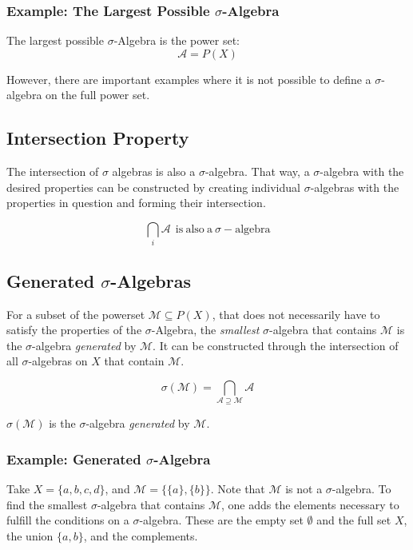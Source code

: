 \subsubsection{Example: The Largest Possible $\sigma$-Algebra} 
The largest possible $\sigma$-Algebra is the power set:
\begin{equation}
\mathscr{A} = P(X)
\end{equation}

However, there are important examples where it is not possible to define a $\sigma$-algebra on the full power set. 


\subsection{Intersection Property}
The intersection of $\sigma$ algebras is also a $\sigma$-algebra. That way, a $\sigma$-algebra with the desired properties can be constructed by creating individual $\sigma$-algebras with the properties in question and forming their intersection.

\begin{equation}
\bigcap_i \mathscr{A} \ \ \mathrm{is\ also\ a\ }\sigma-\mathrm{algebra}
\end{equation}


\subsection{Generated $\sigma$-Algebras}

For a subset of the powerset $\mathscr{M} \subseteq P(X)$, that does not necessarily have to satisfy the properties of the $\sigma$-Algebra, the \textit{smallest} $\sigma$-algebra that contains $\mathscr{M}$ is the $\sigma$-algebra \textit{generated} by $\mathscr{M}$. It can be constructed through the intersection of all $\sigma$-algebras  on $X$ that contain $\mathscr{M}$. 

\begin{equation}
\sigma(\mathscr{M}) = \bigcap_{\mathscr{A}\supseteq\mathscr{M}}\mathscr{A}
\end{equation}

$\sigma(\mathscr{M})$ is the $\sigma$-algebra \textit{generated} by $\mathscr{M}$. 

\subsubsection{Example: Generated $\sigma$-Algebra}

Take $X = \{a,b,c,d\}$, and $\mathscr{M} = \{ \{a\}, \{b\}\}$. Note that $\mathscr{M}$ is not a $\sigma$-algebra. To find the smallest $\sigma$-algebra that contains $\mathscr{M}$, one adds the elements necessary to fulfill the conditions on a $\sigma$-algebra. These are the empty set $\emptyset$ and the full set $X$, the union $\{a,b\}$, and the complements.

